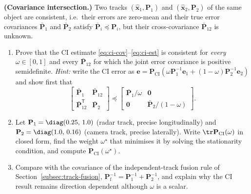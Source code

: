 \begin{prob}\label{prob:ch03:8}
\textbf{(Covariance intersection.)} Two tracks $(\widehat{\mathbf{x}}_1,\mathbf{P}_1)$ and $(\widehat{\mathbf{x}}_2,\mathbf{P}_2)$ of the same object are consistent, i.e.\ their errors are zero-mean and their true error covariances $\bar{\mathbf{P}}_1$ and $\bar{\mathbf{P}}_2$ satisfy $\bar{\mathbf{P}}_i\preceq\mathbf{P}_i$, but their cross-covariance $\bar{\mathbf{P}}_{12}$ is unknown.
\begin{enumerate}
\item[(a)] Prove that the CI estimate \eqref{eq:ci-cov}--\eqref{eq:ci-est} is consistent for \emph{every} $\omega\in[0,1]$ and every $\bar{\mathbf{P}}_{12}$ for which the joint error covariance is positive semidefinite. \emph{Hint:} write the CI error as $\mathbf{e}=\mathbf{P}_{\mathrm{CI}}\left(\omega\mathbf{P}_1^{-1}\mathbf{e}_1+(1-\omega)\mathbf{P}_2^{-1}\mathbf{e}_2\right)$ and show first that
\begin{equation*}
\begin{bmatrix}\bar{\mathbf{P}}_1&\bar{\mathbf{P}}_{12}\\ \bar{\mathbf{P}}_{12}^{\mathsf T}&\bar{\mathbf{P}}_2\end{bmatrix}\preceq\begin{bmatrix}\bar{\mathbf{P}}_1/\omega&\mathbf{0}\\ \mathbf{0}&\bar{\mathbf{P}}_2/(1-\omega)\end{bmatrix}.
\end{equation*}
\item[(b)] Let $\mathbf{P}_1=\diag(0.25,\,1.0)$ (radar track, precise longitudinally) and $\mathbf{P}_2=\diag(1.0,\,0.16)$ (camera track, precise laterally). Write $\tr\mathbf{P}_{\mathrm{CI}}(\omega)$ in closed form, find the weight $\omega^{\star}$ that minimises it by solving the stationarity condition, and compute $\mathbf{P}_{\mathrm{CI}}(\omega^{\star})$.
\item[(c)] Compare with the covariance of the independent-track fusion rule of Section~\ref{subsec:track-fusion}, $\mathbf{P}_{\mathrm{f}}^{-1}=\mathbf{P}_1^{-1}+\mathbf{P}_2^{-1}$, and explain why the CI result remains direction dependent although $\omega$ is a scalar.
\end{enumerate}
\end{prob}

